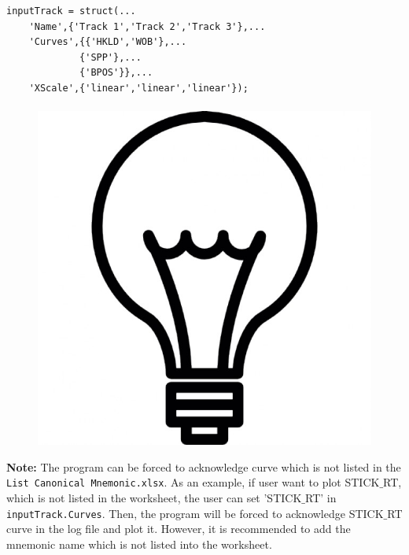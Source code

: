 \documentclass[12pt,a4paper,oneside]{report}
\begin{document}
\begin{lstlisting}[style=Matlab-editor]
inputTrack = struct(...
    'Name',{'Track 1','Track 2','Track 3'},...
    'Curves',{{'HKLD','WOB'},...
    	     {'SPP'},...
    	     {'BPOS'}},...
    'XScale',{'linear','linear','linear'});
\end{lstlisting}

\paragraph{}
\begin{figure}
\vspace{-15pt}
\includegraphics[scale=0.03]{light_bulb.jpg}
\end{figure}
\noindent\textbf{Note:} The program can be forced to acknowledge curve which is not listed in the \texttt{List Canonical Mnemonic.xlsx}. As an example, if user want to plot STICK$\_$RT, which is not listed in the worksheet, the user can set 'STICK$\_$RT' in \texttt{inputTrack.Curves}. Then, the program will be forced to acknowledge STICK$\_$RT curve in the log file and plot it. However, it is recommended to add the mnemonic name which is not listed into the worksheet.
\end{document}

